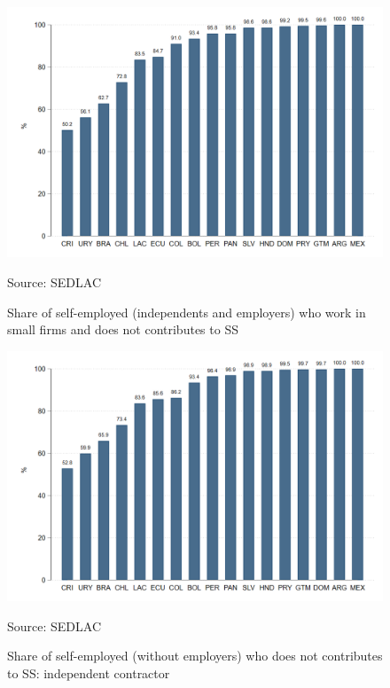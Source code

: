 \documentclass[english]{article}
\begin{document}
\begin{figure}[H]
            \justifying
                \caption{Share of self-employed (independents and employers) who work in small firms and does not contributes to SS}  
            \centerline{\includegraphics[scale=.3]{latex/figures/Self-employed/i_selfsmall.png}}
                \label{fig:i-se}
                \footnotesize{Source: SEDLAC}
\end{figure}

\begin{figure}[H]
            \justifying
                \caption{Share of self-employed (without employers) who does not contributes to SS: independent contractor}  
            \centerline{\includegraphics[scale=.3]{latex/figures/Self-employed/i_independent.png}}
                \label{fig:i-independents}
                \footnotesize{Source: SEDLAC}
\end{figure}
\end{document}
